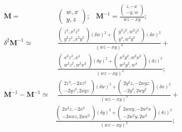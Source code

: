 \documentclass[twoside]{article}
\numberwithin{equation}{section}
\newcommand{\eqspace}{\;\;\;}
\begin{document}
\begin{align}
\label{eqn: inverse matrix 2}
\mathbf{M} =&\; \left( \begin{matrix} w, x \\ y, z \end{matrix} \right);
\eqspace \mathbf{M}^{-1} = \frac{\left( \begin{matrix} z, - x \\ - y, w \end{matrix} \right)}{w z - x y};\\
\label{eqn: inverse matrix 2 variance}
\delta^2 \mathbf{M}^{-1} \simeq&\; \frac{
	 	\left( \begin{matrix} z^4, x^2 z^2 \\ y^2 z^2,  x^2 y^2 \end{matrix} \right) (\delta w)^2 +
	 	\left( \begin{matrix} y^2 z^2, w^2 z^2 \\ y^4, w^2 y^2 \end{matrix} \right) (\delta x)^2}{(w z - x y)^4} + \\
	&\; \frac{\left( \begin{matrix} x^2 z^2, x^4 \\ w^2 z^2, w^2 x^2 \end{matrix} \right) (\delta y)^2 +
	 	\left( \begin{matrix} x^2 y^2, w^2 x^2 \\ w^2 y^2, w^4 \end{matrix} \right) (\delta z)^2
	}{(w z - x y)^4}; \nonumber \\
\label{eqn: inverse matrix 2 bias}
\overline{\mathbf{M}^{-1}} - \mathbf{M}^{-1} \simeq&\; \frac{
	 	\left( \begin{matrix} 2 z^3, -2 x z^2 \\ - 2 y z^2,  2 x y z \end{matrix} \right) (\delta w)^2 +
	 	\left( \begin{matrix} 2 y^2 z, - 2 w y z \\  -2 y^3, 2 w y^2 \end{matrix} \right) (\delta x)^2}{(w z - x y)^3} + \\
	& \frac{\left( \begin{matrix} 2 x^2 z, - 2 x^3 \\  - 2 w x z, 2 w x^2 \end{matrix} \right) (\delta y)^2 +
	 	\left( \begin{matrix} 2 w x y, - 2 w^2 x \\ -2 w^2 y, 2 w^3 \end{matrix} \right) (\delta z)^2
	}{(w z - x y)^3}; \nonumber
\end{align}
\end{document}
